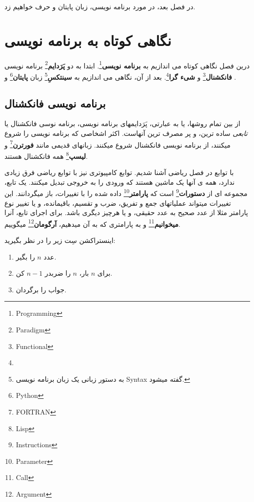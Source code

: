 \documentclass[14pt,a4paper]{memoir}
\begin{document}
در فصل بعد، در مورد برنامه نویسی، زبان پایتان و  حرف خواهیم زد.
	 
	   
	 \chapter{نگاهی کوتاه به برنامه نویسی}\label{programming}
	 
	 درین فصل نگاهی کوتاه می اندازیم به \textbf{برنامه نویسی}\footnote{Programming}. ابتدا به دو \textbf{پَرَدایم}\footnote{Paradigm} برنامه نویسی \textbf{فانکشنال}\footnote{Functional} و \textbf{شیء گرا}\footnote{}. بعد از آن، نگاهی می اندازیم به \textbf{سینتکسِ}\footnote{به دستور زبانی یک زبان برنامه نویسی Syntax گفته میشود.} زبان \textbf{پایتان}\footnote{Python} و \textbf{}.
	 
\section{برنامه نویسی فانکشنال}\label{functional}

از بین تمام روشها، یا به عبارتی، پَرَدایمهای برنامه نویسی، برنامه نوسی فانکشنال یا \textit{تابعی} ساده ترین، و پر مصرف ترین آنهاست. اکثر اشخاصی که برنامه نویسی را شروع میکنند، از برنامه نویسی فانکشنال شروع میکنند. زبانهای قدیمی مانند \textbf{فورترن}\footnote{FORTRAN}	و \textbf{لیسپ}\footnote{Lisp} همه فانکشنال هستند. 

با توابع در فصل ریاضی آشنا شدیم. توابع کامپیوتری نیز با توابع ریاضی فرق زیادی ندارد، همه ی آنها یک ماشین هستند که ورودی را به خروجی تبدیل میکنند. یک تابع، مجموعه ای از \textbf{دستورات}\footnote{Instructions} است که \textbf{پارامتر}\footnote{Parameter} داده شده را با تغییرات، باز میگردانند. این تغییرات میتواند عملیاتهای جمع و تفریق، ضرب و تقسیم، باقیمانده، و یا تغییر نوع پارامتر مثلا از عدد صحیح به عدد حقیقی، و یا هرچیز دیگری باشد. برای اجرای تابع، آنرا \textbf{میخوانیم}\footnote{Call} و به پارامتری که به آن میدهیم، \textbf{آرگومان}\footnote{Argument} میگوییم.

اینستراکشن سِت زیر را در نظر بگیرید:

\begin{enumerate}
	\item عدد $ n $ را بگیر.
	\item برای $ n $ بار، $ n $ را ضربدر $n - 1$ کن.
	\item جواب را برگردان.

\end{enumerate}
\end{document}
